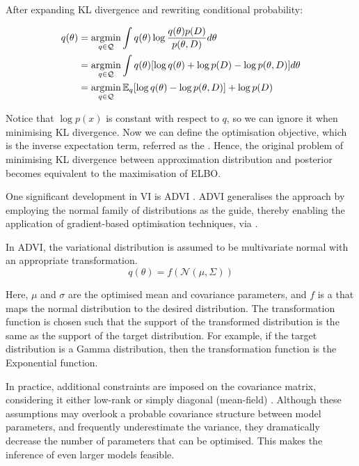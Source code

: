 After expanding KL divergence and rewriting conditional probability:

\begin{align}
q(\theta) &= \operatorname*{\arg\!\min}_{q \in \mathcal{Q}} \int q(\theta) \log \frac{q(\theta) p(D)}{p(\theta, D)} d\theta \\
&= \operatorname*{\arg\!\min}_{q \in \mathcal{Q}} \int q(\theta) [\log q(\theta) + \log p(D) - \log p(\theta, D)] d\theta \\
&= \operatorname*{\arg\!\min}_{q \in \mathcal{Q}} \mathbb{E}_q [\log q(\theta) -  \log p(\theta, D)] + \log p(D)
\end{align}

Notice that $\log p(x)$ is constant with respect to $q$, so we can ignore it when minimising KL divergence. Now we can define the optimisation objective, which is the inverse expectation term, referred as the . Hence, the original problem of minimising KL divergence between approximation distribution and posterior becomes equivalent to the maximisation of \ac{ELBO}. 

One significant development in \ac{VI} is \ac{ADVI} \parencite{Kucukelbir2016-gn}. \ac{ADVI} generalises the approach by employing the normal family of distributions as the guide, thereby enabling the application of gradient-based optimisation techniques, via .

In \ac{ADVI}, the variational distribution is assumed to be multivariate normal with an appropriate transformation.
\begin{equation}
q(\theta) = f(\mathcal{N}(\mu, \Sigma))
\end{equation}

Here, $\mu$ and $\sigma$ are the optimised mean and covariance parameters, and $f$ is a  that maps the normal distribution to the desired distribution. The transformation function is chosen such that the support of the transformed distribution is the same as the support of the target distribution. For example, if the target distribution is a Gamma distribution, then the transformation function is the Exponential function. 

In practice, additional constraints are imposed on the covariance matrix, considering it either low-rank or simply diagonal (mean-field) \parencite{Blei2017-dm}. Although these assumptions may overlook a probable covariance structure between model parameters, and frequently underestimate the variance, they dramatically decrease the number of parameters that can be optimised. This makes the inference of even larger models feasible.

